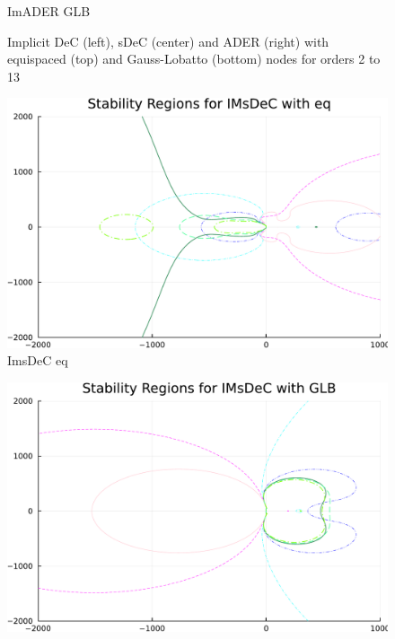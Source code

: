 \begin{figure}
\begin{minipage}[t]{0.32\textwidth}
		ImADER GLB
	\end{minipage}
	\caption{Implicit DeC (left), sDeC (center) and ADER (right) with equispaced (top) and Gauss-Lobatto (bottom) nodes for orders 2 to 13}
	\label{fig: ODEIMDeCADER}
\end{figure}

\begin{figure}
	\centering
	\begin{minipage}[t]{0.45\textwidth}
		\centering
		\includegraphics[width=\textwidth, trim={0 0 0 22}, clip]{pdf/odepics/ImsDeC_eq_ord20-crop.pdf}\\
		ImsDeC eq
	\end{minipage}
	\begin{minipage}[t]{0.45\textwidth}
		\centering
		\includegraphics[width=\textwidth, trim={0 0 0 22}, clip]{pdf/odepics/ImsDeC_GLB_ord20-crop.pdf}\\

\end{minipage}
\end{figure}
